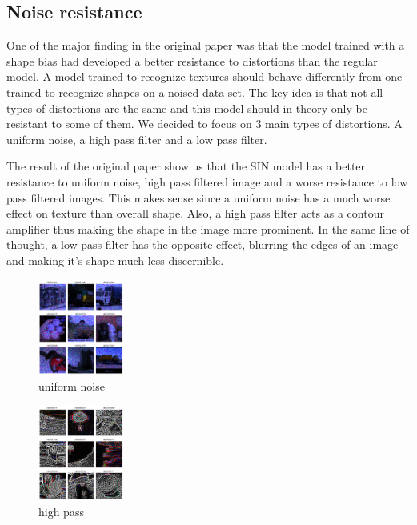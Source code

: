 \documentclass{article}
\begin{document}
\subsection{Noise resistance}


One of the major finding in the original paper was that the model trained with a shape bias had developed a better resistance to distortions than the regular model.
A model trained to recognize textures should behave differently from one trained to recognize shapes on a noised data set.  The key idea is that not all types of distortions are the same and this model should in theory only be resistant to some of them.  We decided to focus on 3 main types of distortions.  A uniform noise, a high pass filter and a low pass filter.

The result of the original paper show us that the SIN model has a better resistance to uniform noise, high pass filtered image and a worse resistance to low pass filtered images.
This makes sense since a uniform noise has a much worse effect on texture than overall shape. Also, a high pass filter acts as a contour amplifier thus making the shape in the image more prominent. In the same line of thought, a low pass filter has the opposite effect, blurring the edges of an image and making it's shape much less discernible.

\begin{figure}[h!]
\centering
\includegraphics[width = 0.25\textwidth]{imgs/image_uniform}
\caption{uniform noise}
\end{figure}

\begin{figure}[h!]
\centering
\includegraphics[width = 0.25\textwidth]{imgs/image_high}
\caption{high pass}
\end{figure}
\end{document}
